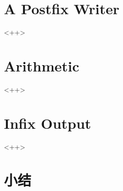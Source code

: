 \section{A Postfix Writer}<++>

\section{Arithmetic}<++>

\section{Infix Output}<++>

\section{小结}


\newpage{\thispagestyle{empty}\cleardoublepage}

